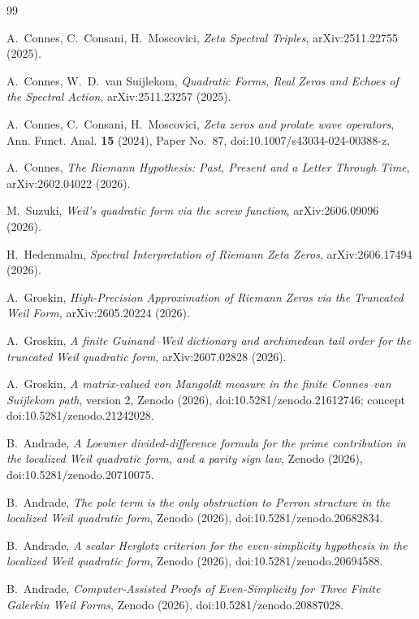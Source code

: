 \documentclass[11pt,a4paper]{article}
\begin{document}
\begin{thebibliography}{99}

A.~Connes, C.~Consani, H.~Moscovici,
\emph{Zeta Spectral Triples}, arXiv:2511.22755 (2025).

A.~Connes, W.~D.~van Suijlekom,
\emph{Quadratic Forms, Real Zeros and Echoes of the Spectral Action},
arXiv:2511.23257 (2025).

A.~Connes, C.~Consani, H.~Moscovici,
\emph{Zeta zeros and prolate wave operators}, Ann. Funct. Anal. \textbf{15}
(2024), Paper No.~87, doi:10.1007/s43034-024-00388-z.

A.~Connes,
\emph{The Riemann Hypothesis: Past, Present and a Letter Through Time},
arXiv:2602.04022 (2026).

M.~Suzuki,
\emph{Weil's quadratic form via the screw function}, arXiv:2606.09096 (2026).

H.~Hedenmalm,
\emph{Spectral Interpretation of Riemann Zeta Zeros}, arXiv:2606.17494 (2026).

A.~Groskin,
\emph{High-Precision Approximation of Riemann Zeros via the Truncated Weil
Form}, arXiv:2605.20224 (2026).

A.~Groskin,
\emph{A finite Guinand--Weil dictionary and archimedean tail order for the
truncated Weil quadratic form}, arXiv:2607.02828 (2026).

A.~Groskin,
\emph{A matrix-valued von Mangoldt measure in the finite
Connes--van Suijlekom path}, version 2, Zenodo (2026),
doi:10.5281/zenodo.21612746; concept doi:10.5281/zenodo.21242028.

B.~Andrade,
\emph{A Loewner divided-difference formula for the prime contribution in the
localized Weil quadratic form, and a parity sign law}, Zenodo (2026),
doi:10.5281/zenodo.20710075.

B.~Andrade,
\emph{The pole term is the only obstruction to Perron structure in the
localized Weil quadratic form}, Zenodo (2026),
doi:10.5281/zenodo.20682834.

B.~Andrade,
\emph{A scalar Herglotz criterion for the even-simplicity hypothesis in the
localized Weil quadratic form}, Zenodo (2026),
doi:10.5281/zenodo.20694588.

B.~Andrade,
\emph{Computer-Assisted Proofs of Even-Simplicity for Three Finite Galerkin
Weil Forms}, Zenodo (2026), doi:10.5281/zenodo.20887028.


\end{thebibliography}
\end{document}
